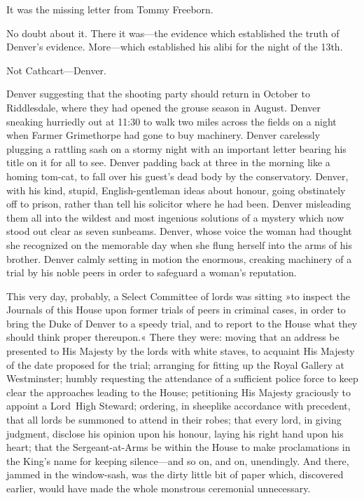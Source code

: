 It was the missing letter from Tommy Freeborn.

No doubt about it. There it was—the evidence which established the truth of Denver's evidence. More—which established his alibi for the night of the 13th.

Not Cathcart—Denver.

Denver suggesting that the shooting party should return in October to Riddlesdale, where they had opened the grouse season in August.  Denver sneaking hurriedly out at 11:30 to walk two miles across the fields on a night when Farmer Grimethorpe had gone to buy machinery.  Denver carelessly plugging a rattling sash on a stormy night with an important letter bearing his title on it for all to see. Denver padding back at three in the morning like a homing tom-cat, to fall over his guest's dead body by the conservatory. Denver, with his kind, stupid, English-gentleman ideas about honour, going obstinately off to prison, rather than tell his solicitor where he had been. Denver misleading them all into the wildest and most ingenious solutions of a mystery which now stood out clear as seven sunbeams. Denver, whose voice the woman had thought she recognized on the memorable day when she flung herself into the arms of his brother. Denver calmly setting in motion the enormous, creaking machinery of a trial by his noble peers in order to safeguard a woman's reputation.

This very day, probably, a Select Committee of lords was sitting »to inspect the Journals of this House upon former trials of peers in criminal cases, in order to bring the Duke of Denver to a speedy trial, and to report to the House what they should think proper thereupon.« There they were: moving that an address be presented to His Majesty by the lords with white staves, to acquaint His Majesty of the date proposed for the trial; arranging for fitting up the Royal Gallery at Westminster; humbly requesting the attendance of a sufficient police force to keep clear the approaches leading to the House; petitioning His Majesty graciously to appoint a Lord~High Steward; ordering, in sheeplike accordance with precedent, that all lords be summoned to attend in their robes; that every lord, in giving judgment, disclose his opinion upon his honour, laying his right hand upon his heart; that the Sergeant-at-Arms be within the House to make proclamations in the King's name for keeping silence—and so on, and on, unendingly.  And there, jammed in the window-sash, was the dirty little bit of paper which, discovered earlier, would have made the whole monstrous ceremonial unnecessary.

